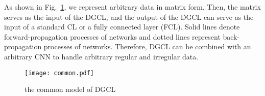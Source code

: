 \documentclass[11pt]{article}
\begin{document}
As shown in Fig.~\ref{fig:common}, we represent arbitrary data in matrix form. Then, the matrix serves as the input of the DGCL, and the output of the DGCL can serve as the input of a standard CL or a fully connected layer (FCL). Solid lines denote forward-propagation processes of networks and dotted lines represent back-propagation processes of networks. Therefore, DGCL can be combined with an arbitrary CNN to handle arbitrary regular and irregular data.



\begin{figure}
\vspace{-0.1in}
\centering
\texttt{[image: common.pdf]}
\vspace{-0.1in}
\caption{the common model of DGCL}\label{fig:common}
\vspace{-0.2in}
\end{figure}


\end{document}
